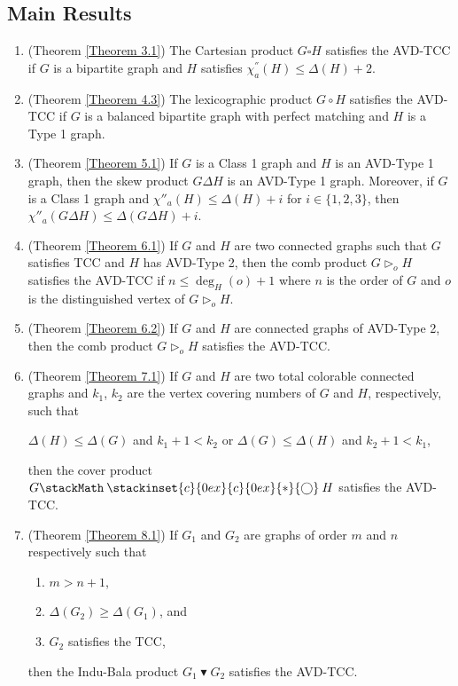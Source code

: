 \documentclass[12pt]{article}
\newcommand\oast{\stackMath\mathbin{\stackinset{c}{0ex}{c}{0ex}{\ast}{\bigcirc}}}
\theoremstyle{definition}
\begin{document}
\subsection{Main Results}
\begin{enumerate}
    \item (Theorem \ref{Theorem 3.1}) The Cartesian product $G\square H$ satisfies the AVD-TCC if $G$ is a bipartite graph and $H$ satisfies $\chi^{''}_{a}(H)\leq \Delta(H)+2$.
    
    \item (Theorem \ref{Theorem 4.3}) The lexicographic product $G\circ H$ satisfies the AVD-TCC if $G$ is a balanced bipartite graph with perfect matching and $H$ is a Type 1 graph. 
    
    \item (Theorem \ref{Theorem 5.1}) If $G$ is a Class 1 graph and $H$ is an AVD-Type 1 graph, then the skew product $G\Delta H$ is 
    an AVD-Type 1 graph. 
    Moreover, if $G$ is a Class 1 graph and $\chi''_{a}(H)\leq \Delta(H)+i$ for $i\in \{1,2,3\}$, then $\chi''_{a}(G\Delta H)\leq \Delta(G\Delta H) +i$.

    \item (Theorem \ref{Theorem 6.1}) If $G$ and $H$ are two connected graphs such that $G$ satisfies TCC and $H$ has AVD-Type 2, then the comb product $G \triangleright_o H$ satisfies the AVD-TCC if $n\leq \deg_{H}(o)+1$ where $n$ is the order of $G$ and $o$ is the distinguished vertex of $G\triangleright_o H$.

    \item (Theorem \ref{Theorem 6.2}) If $G$ and $H$ are connected graphs of AVD-Type 2, then the comb product $G \triangleright_o H$ satisfies the AVD-TCC.

    \item (Theorem \ref{Theorem 7.1}) If $G$ and $H$ are two total colorable connected graphs and $k_{1}$, $k_{2}$ are the vertex covering numbers of $G$ and $H$, respectively, such that 
\begin{center}
    $\Delta(H) \leq \Delta(G)$ and $k_{1}+1 < k_{2}$ or $\Delta(G) \leq \Delta(H)$ and
$k_{2}+1 < k_{1}$, 
\end{center}
then the cover
product $G \oast H$ satisfies the AVD-TCC.

    \item (Theorem \ref{Theorem 8.1}) If $G_1$ and $G_2$ are graphs of order $m$ and $n$ respectively such that
    \begin{enumerate}
        \item $m>n+1$,
        \item $\Delta(G_2)\geq\Delta(G_1)$, and
        \item $G_2$ satisfies the TCC,
    \end{enumerate}
    then the Indu-Bala product $G_1\blacktriangledown G_2$ satisfies the AVD-TCC.
\end{enumerate}
\end{document}
